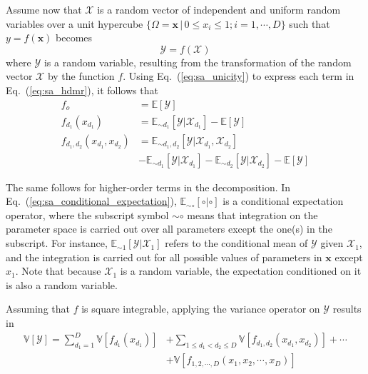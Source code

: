 Assume now that $\bm{\mathcal{X}}$ is a random vector of independent and uniform random variables over a unit hypercube
$\{\Omega = \bm{x} \, | \, 0 \leq x_i  \leq 1; i = 1,\cdots, D\}$ such that $y = f(\bm{x})$ becomes
\begin{equation}
	\mathcal{Y} = f(\bm{\mathcal{X}})
\label{eq:sa_random_function}
\end{equation}
where $\mathcal{Y}$ is a random variable, resulting from the transformation of the random vector $\bm{\mathcal{X}}$ by the function $f$.
Using Eq.~(\ref{eq:sa_unicity}) to express each term in Eq.~(\ref{eq:sa_hdmr}), it follows that
\begin{equation}
	\begin{split}
		f_o & = \mathbb{E}[\mathcal{Y}] \\
	  f_{d_1}(x_{d_1}) & = \mathbb{E}_{\sim d_1}[\mathcal{Y}|\mathcal{X}_{d_1}] - \mathbb{E}[\mathcal{Y}]\\
    f_{d_1,d_2}(x_{d_1},x_{d_2}) & = \mathbb{E}_{\sim d_1,d_2} [\mathcal{Y}|\mathcal{X}_{d_1}, \mathcal{X}_{d_2}] \\
																 & - \mathbb{E}_{\sim d_1}[\mathcal{Y}|\mathcal{X}_{d_1}] - \mathbb{E}_{\sim d_2}[\mathcal{Y}|\mathcal{X}_{d_2}] - \mathbb{E}[\mathcal{Y}] 
	\end{split}
\label{eq:sa_conditional_expectation}
\end{equation}

The same follows for higher-order terms in the decomposition. 
In Eq.~(\ref{eq:sa_conditional_expectation}),
$\mathbb{E}_{\sim \circ} [\circ|\circ]$ is a conditional expectation operator,
where the subscript symbol $\sim\circ$ means that integration on the parameter space is carried out over all parameters except the one(s) in the subscript.
For instance, $\mathbb{E}_{\sim 1} [\mathcal{Y}|\mathcal{X}_1]$ refers to the conditional mean of $\mathcal{Y}$ given $\mathcal{X}_1$, and the integration is carried out for all possible values of parameters in $\bm{x}$ except $x_1$.
Note that because $\mathcal{X}_1$ is a random variable, the expectation conditioned on it is also a random variable.

Assuming that $f$ is square integrable, applying the variance operator on $\mathcal{Y}$ results in
\begin{equation}
	\begin{split}
		\mathbb{V}[\mathcal{Y}] = \sum_{d_1=1}^{D} \mathbb{V}[f_{d_1} (x_{d_1})] & + \sum_{1 \leq d_1 < d_2 \leq D} \mathbb{V} [f_{d_1,d_2} (x_{d_1}, x_{d_2})] + \cdots \\
	                                                       & + \mathbb{V} [f_{1,2,\cdots,D} (x_1, x_2, \cdots, x_D)]
		\end{split}
\label{eq:sa_variance_decomposition}
\end{equation}

